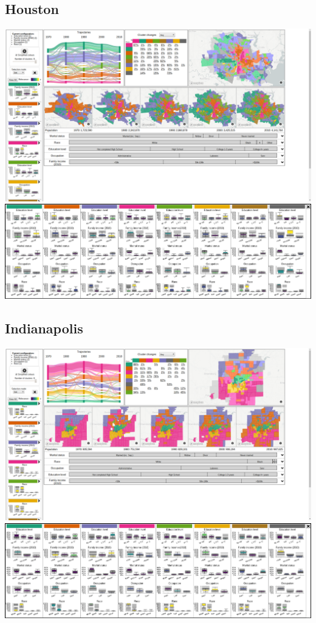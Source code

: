 \documentclass[a4paper]{article}
\begin{document}
\subsection{Houston}
\begin{center}
	\includegraphics[width=\linewidth]{25a.png}
	\includegraphics[width=\linewidth]{25b.png}
\end{center} \clearpage



\subsection{Indianapolis}
\begin{center}
	\includegraphics[width=\linewidth]{26a.png}
	\includegraphics[width=\linewidth]{26b.png}
\end{center} \clearpage
\end{document}
